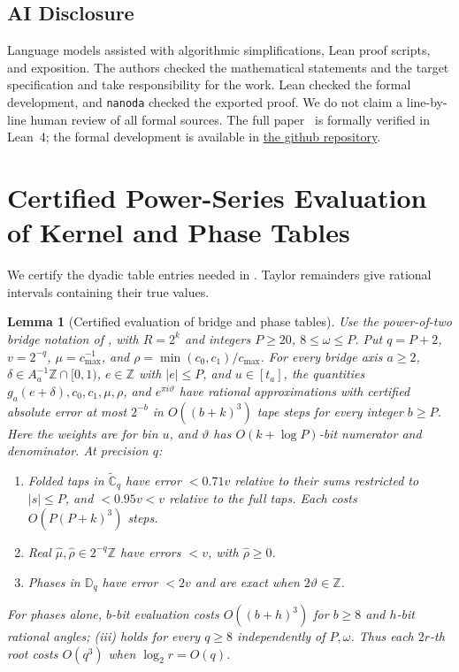 \documentclass[11pt]{article}
\newtheorem{lemma}[theorem]{Lemma}
\theoremstyle{definition}
\renewcommand{\label}[1]{}%
\newcommand{\Z}{\mathbb{Z}}
\newcommand{\Cg}{\widetilde{\mathbb{C}}}
\newcommand{\Disk}{\mathbb{D}}
\newcommand{\abs}[1]{\left\lvert #1 \right\rvert}
\begin{document}
\subsection{AI Disclosure}\label{sec:ai-disclosure}

Language models assisted with algorithmic simplifications, Lean proof scripts,
and exposition. The authors checked the mathematical statements and the target
specification and take responsibility for the work.
Lean checked the formal development, and \texttt{nanoda} checked the exported
proof. We do not claim a line-by-line human review of all formal sources.
The full paper~\cite{Full26} is formally verified in Lean~4; the formal
development is available in \href{https://github.com/lockqueue/intmul}{the github repository}.

\appendix
\section{Certified Power-Series Evaluation of Kernel and Phase Tables}
\label{app:tables}

We certify the dyadic table entries needed in .
Taylor remainders give rational intervals containing their true values.

\begin{lemma}[Certified evaluation of bridge and phase tables]\label{lem:app-tables}
Use the power-of-two bridge notation of ,
with $R=2^k$ and integers $P\ge20$, $8\le\omega\le P$.
Put $q=P+2$, $v=2^{-q}$, $\mu=c_{\max}^{-1}$, and
$\rho=\min(c_0,c_1)/c_{\max}$.
For every bridge axis $a\ge2$, $\delta\in A_a^{-1}\Z\cap[0,1)$,
$e\in\Z$ with $\abs{e}\le P$, and $u\in[t_a]$, the quantities
$g_a(e+\delta),c_0,c_1,\mu,\rho$, and $e^{\pi i\vartheta}$
have rational approximations with certified absolute error at most $2^{-b}$
in $O((b+k)^3)$ tape steps for every integer $b\ge P$.
Here the weights are for bin $u$, and $\vartheta$ has
$O(k+\log P)$-bit numerator and denominator.
At precision $q$:
\begin{enumerate}[label=\textup{(\roman*)},leftmargin=*,topsep=2pt,itemsep=0pt,parsep=0pt]
\item Folded taps in $\Cg_q$ have error $<0.71v$ relative to their sums
restricted to $\abs{s}\le P$, and $<0.95v<v$ relative to the full taps.
Each costs $O(P(P+k)^3)$ steps.
\item Real $\hat\mu,\hat\rho\in2^{-q}\Z$ have errors $<v$, with $\hat\rho\ge0$.
\item Phases in $\Disk_q$ have error $<2v$ and are exact when $2\vartheta\in\Z$.
\end{enumerate}
For phases alone, $b$-bit evaluation costs $O((b+h)^3)$ for $b\ge8$ and
$h$-bit rational angles; \textup{(iii)} holds for every $q\ge8$ independently
of $P,\omega$.
Thus each $2r$-th root costs $O(q^3)$ when $\log_2r=O(q)$.
\end{lemma}
\end{document}
